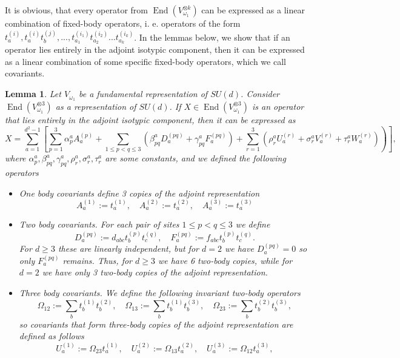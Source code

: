 \documentclass[11pt,letterpaper]{article}
\theoremstyle{plain}
\theoremstyle{plain}
\theoremstyle{plain}
\theoremstyle{plain}
\theoremstyle{plain}
\theoremstyle{plain}
\theoremstyle{plain}
\newtheorem{smlemma}[smtheorem]{Lemma}
\theoremstyle{definition}
\theoremstyle{plain}
\begin{document}
It is obvious, that every operator from $\operatorname{End}(V_{\omega_1}^{\otimes k})$ 
can be expressed as a linear combination of fixed-body operators, i. e. operators of the form
$t_a^{(i)}, t_a^{(i)} t_b^{(j)}, ..., t_{a_1}^{(i_1)} t_{a_2}^{(i_2)} ... t_{a_k}^{(i_k)}$. 
In the lemmas below, we show that if an operator lies entirely in the adjoint isotypic component, then it can be expressed as 
a linear combination of some specific fixed-body operators, which we call covariants.

\begin{smlemma}\label{lem:adjoint-3site}
    Let $V_{\omega_1}$ be a fundamental representation of $SU(d)$. Consider
    $\operatorname{End}(V_{\omega_1}^{\otimes 3})$ as a representation of $SU(d)$. If $X\in \operatorname{End}(V_{\omega_1}^{\otimes 3})$ is an operator
    that lies entirely in the adjoint isotypic component, then it can be expressed as
    \[
        \left.X=\sum_{a=1}^{d^2-1}\left[\sum_{p=1}^3 \alpha_p^a A_a^{(p)}+\sum_{1 \leq p<q \leq 3}\left(\beta_{p q}^a D_a^{(p q)}+\gamma_{p q}^a F_a^{(p q)}\right)+\sum_{r=1}^3\left(\rho_r^a U_a^{(r)}+\sigma_r^a V_a^{(r)}+\tau_r^a W_a^{(r)}\right)\right)\right],
    \]
    where $\alpha_p^a, \beta_{p q}^a, \gamma_{p q}^a, \rho_r^a, \sigma_r^a, \tau_r^a$ are some constants, and we defined the following operators
    \begin{itemize}
    \item  One body covariants define 3 copies of the adjoint representation
        \[
            A_a^{(1)}:=t_a^{(1)}, \quad A_a^{(2)}:=t_a^{(2)}, \quad A_a^{(3)}:=t_a^{(3)}
        \]
    \item  Two body covariants. For each pair of sites $1 \leq p<q \leq 3$ we define
        \[
            D_a^{(p q)}:=d_{a b c} t_b^{(p)} t_c^{(q)}, \quad F_a^{(p q)}:=f_{a b c} t_b^{(p)} t_c^{(q)}.
        \]
        For $d\geq 3$ these are linearly independent, but for $d=2$ we have $D_a^{(p q)}=0$ so only $F_a^{(p q)}$ remains.
        Thus, for $d\geq 3$ we have 6 two-body copies, while for $d=2$ we have only 3 two-body copies of the adjoint representation.
    \item  Three body covariants. We define the following invariant two-body operators
        \[
            \Omega_{12}:=\sum_b t_b^{(1)} t_b^{(2)}, \quad \Omega_{13}:=\sum_b t_b^{(1)} t_b^{(3)}, \quad \Omega_{23}:=\sum_b t_b^{(2)} t_b^{(3)},
        \]
        so covariants that form three-body copies of the adjoint representation are defined as follows
        \[
            U_a^{(1)}:=\Omega_{23} t_a^{(1)}, \quad U_a^{(2)}:=\Omega_{13} t_a^{(2)}, \quad U_a^{(3)}:=\Omega_{12} t_a^{(3)},
\]
\end{itemize}
\end{smlemma}
\end{document}
